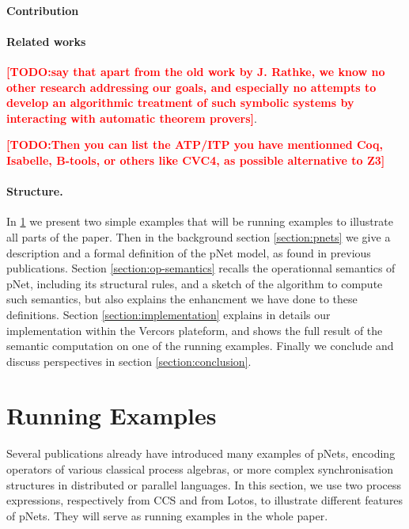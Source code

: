 \documentclass{lncs/llncs}
\newcommand{\TODO}[1]{\textcolor{red}{\textbf{[TODO:#1]}}}
\begin{document}
\paragraph{Contribution}

\paragraph{Related works}

\TODO{say that apart from the old work by J. Rathke, we know no other
  research addressing our goals, and especially no attempts to develop
  an algorithmic treatment of such symbolic systems by interacting
  with automatic theorem provers}.

\TODO{Then you can list the ATP/ITP you have mentionned Coq, Isabelle,
  B-tools, or others like CVC4, as possible alternative to Z3}

\paragraph{Structure.}
In \ref{section:examples} we present two simple examples that will be
running examples to illustrate all parts of the paper. Then in the
background section
\ref{section:pnets} we give a description and a formal definition of
the pNet model, as found in previous publications.
Section \ref{section:op-semantics} recalls the operationnal semantics
of pNet, including its structural rules, and a sketch of the algorithm
to compute such semantics, but also explains the enhancment we have
done to these definitions.
Section \ref{section:implementation} explains in details our
implementation within the Vercors plateform, and shows the full result of
the semantic computation on one of the running examples.
Finally we conclude and discuss perspectives in section
\ref{section:conclusion}. 


\section{Running Examples}
\label{section:examples}

Several publications \cite{HMZ:PDP15,henrio:Forte2016} already have introduced
many examples of pNets, encoding
operators of various classical process algebras, or more complex
synchronisation structures in distributed or parallel languages.
In this section, we use two process expressions, respectively from CCS
and from Lotos, to illustrate different features of pNets. They will
serve as running examples in the whole paper.  
\end{document}
